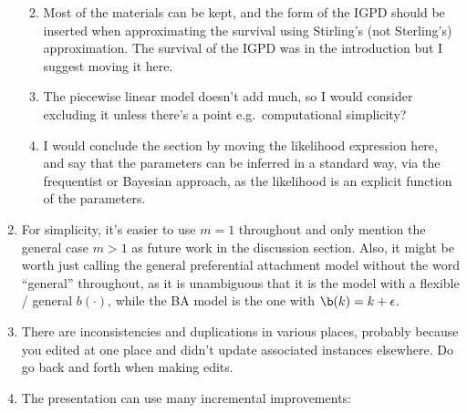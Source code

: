 \documentclass[
  sn-basic,
]{sn-jnl}
\providecommand{\tightlist}{%
  \setlength{\itemsep}{0pt}\setlength{\parskip}{0pt}}
\theoremstyle{plain}
\theoremstyle{remark}
\begin{document}
\begin{enumerate}
  \begin{enumerate}
  \def\labelenumii{\alph{enumii}.}
  \tightlist
  \item
    Most of the materials can be kept, and the form of the IGPD should
    be inserted when approximating the survival using Stirling's (not
    Sterling's) approximation. The survival of the IGPD was in the
    introduction but I suggest moving it here.
  \item
    The piecewise linear model doesn't add much, so I would consider
    excluding it unless there's a point e.g.~computational simplicity?
  \item
    I would conclude the section by moving the likelihood expression
    here, and say that the parameters can be inferred in a standard way,
    via the frequentist or Bayesian approach, as the likelihood is an
    explicit function of the parameters.
  \end{enumerate}
\item
  For simplicity, it's easier to use \(m=1\) throughout and only mention
  the general case \(m>1\) as future work in the discussion section.
  Also, it might be worth just calling the general preferential
  attachment model without the word ``general'' throughout, as it is
  unambiguous that it is the model with a flexible / general
  \(b(\cdot)\), while the BA model is the one with \(\b(k)=k+\epsilon\).
\item
  There are inconsistencies and duplications in various places, probably
  because you edited at one place and didn't update associated instances
  elsewhere. Do go back and forth when making edits.
\item
  The presentation can use many incremental improvements:


\end{enumerate}
\end{document}

